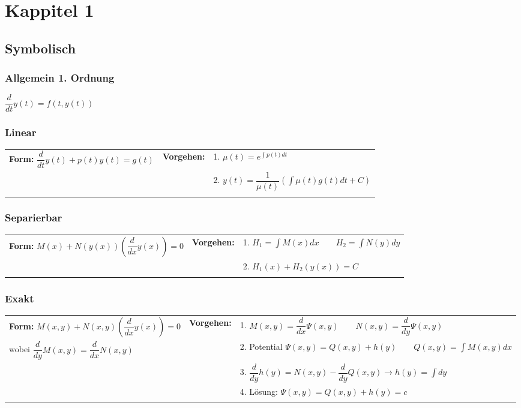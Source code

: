 \section{Kappitel 1}

\subsection{Symbolisch}

\subsubsection{Allgemein 1. Ordnung}
$\dfrac{d}{dt}y(t)=f(t,y(t))$

\subsubsection{Linear}
\begin{tabular}{p{6cm}p{1.8cm}p{10.5cm}}
\textbf{Form:} $\dfrac{d}{dt}y(t) +p(t)y(t)=g(t)$ &
\textbf{Vorgehen:}              &
1. $\mu(t)=e^{\int p(t)dt}$ \\ &&
2. $y(t)=\dfrac{1}{\mu(t)}\left(\int{\mu(t)g(t) dt+C}\right)$ \\ &&
\end{tabular}

\subsubsection{Separierbar}
\begin{tabular}{p{6cm}p{1.8cm}p{10.5cm}}
\textbf{Form:} $M(x)+N(y(x))(\dfrac{d}{dx}y(x))=0$ &
\textbf{Vorgehen:}              &
1. $H_1=\int M(x)dx \qquad H_2=\int N(y)dy$ \\ &&
2. $H_1(x) + H_2(y(x)) = C$ \\ &&
\end{tabular}

\subsubsection{Exakt}
\begin{tabular}{p{6cm}p{1.8cm}p{10.5cm}}
\textbf{Form:} $M(x,y) + N(x,y)(\dfrac{d}{dx}y(x))=0$ &
\textbf{Vorgehen:}              &
1. $ M(x,y) = \dfrac{d}{dx}\Psi(x,y) \qquad N(x,y) = \dfrac{d}{dy}\Psi(x,y) $ \\
wobei $\dfrac{d}{dy}M(x,y) = \dfrac{d}{dx}N(x,y)$ &&
2. Potential $\Psi(x,y) = Q(x,y) + h(y) \qquad Q(x,y) = \int M(x,y) dx$ \\ &&
3. $\dfrac{d}{dy}h(y) = N(x,y) - \dfrac{d}{dy}Q(x,y) \rightarrow h(y)=\int dy$  \\ &&
4. Lösung: $\Psi(x,y) = Q(x,y) + h(y) = c$\\ &&
\end{tabular}

